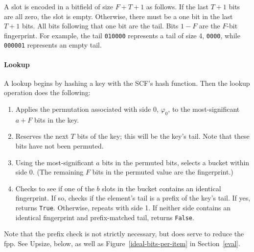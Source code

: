 \documentclass[letterpaper,twocolumn,10pt]{article}
\newcommand{\TCF}{SCF}
\newcommand{\TCF}{TCF}
\begin{document}
A slot is encoded in a bitfield of size $F+T+1$ as follows.
If the last $T+1$ bits are all zero, the slot is empty.
Otherwise, there must be a one bit in the last $T+1$ bits.
All bits following that one bit are the tail.
Bits $1-F$ are the $F$-bit fingerprint.
For example, the tail {\tt 010000} represents a tail of size 4, {\tt 0000}, while {\tt 000001} represents an empty tail.

\paragraph{Lookup}
A lookup begins by hashing a key with the \TCF{}'s hash function. %
Then the lookup operation does the following:

\begin{enumerate}
\item Applies the permutation associated with side 0, $\varphi_0$, to the most-significant $a + F$ bits in the key. %
\item Reserves the next $T$ bits of the key; this will be the key's tail.
Note that these bits have not been permuted.
\item Using the most-significant $a$ bits in the permuted bits, selects a bucket within side 0. %
(The remaining $F$ bits in the permuted value are the fingerprint.)
\item Checks to see if one of the $b$ slots in the bucket contains an identical fingerprint. %
If so, checks if the element's tail is a prefix of the key's tail.
If yes, returns \verb|True|.
Otherwise, repeats with side 1.
If neither side contains an identical fingerprint and prefix-matched tail, returns \verb|False|.
\end{enumerate}

Note that the prefix check is not strictly necessary, but does serve to reduce the fpp.
See Upsize, below, as well as Figure~\ref{ideal-bits-per-item} in Section~\ref{eval}.

\end{document}
